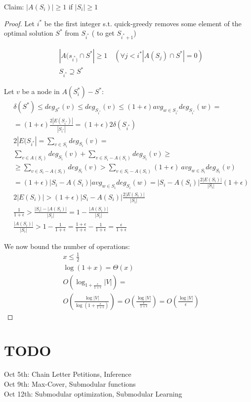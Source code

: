 \documentclass[]{article}
\begin{document}
	Claim: $ |A(S_i)| \geq 1 $ if $ |S_i| \geq 1$
	\begin{proof}

	Let $ i^* $ be the first integer s.t. quick-greedy removes some element of the optimal solution $ S^* $ from $ S_{i^*} $ ( to get $ S_{i^* + 1} $)
	
	\begin{align*}
	&|A(s_{i^*)} \cap S^* | \geq 1 \quad \left(\forall j < i^* |A(S_j) \cap S^*| = 0 \right)\\
	&S_{i^*} \supseteq S^*
 	\end{align*}
 	
 	Let $ v $ be a node in $ A(S_i^*) - S^* $:\\
 	\begin{align*}
 		&\delta(S^*) \leq deg_{S^*}(v) \leq deg_{S_{i^*}}(v) \leq (1+\epsilon) avg_{w \in S_{i^*}} deg_{S_{i^*}}(w)=\\
 		&=(1+\epsilon) \frac{2|E(S_{i^*})|}{|S_{i^*}|} = (1+\epsilon) 2 \delta(S_{i^*})\\
 		& 2|E(S_{i^*}| = \sum_{v \in S_i}^{} deg_{S_i}(v) =\\
 		&\sum_{v \in A(S_i)}^{} deg_{S_i}(v) + \sum_{v \in S_i - A(S_i)}^{} deg_{S_i}(v)\geq\\
 		&\geq \sum_{v \in S_i - A(S_i)}^{} deg_{S_i}(v) > \sum_{v \in S_i - A(S_i)}^{} (1+\epsilon)\ avg_{w \in S_i}deg_{S_i}(v)\\
 		&=(1+\epsilon) |S_i - A(S_i)|  avg_{w \in S_i}deg_{S_i}(w) = |S_i - A(S_i)| \frac{2|E(S_{i})|}{|S_{i}|} (1+\epsilon)\\
 		&2|E(S_i)| > (1+\epsilon) |S_i - A(S_i)| \frac{2|E(S_{i})|}{|S_{i}|}\\
 		& \frac{1}{1+\epsilon} > \frac{|S_i| - |A(S_i)|}{|S_i|} = 1 - \frac{|A(S_i)|}{|S_i|}\\
 		&\frac{|A(S_i)|}{|S_i|} > 1 - \frac{1}{1+\epsilon} = \frac{1+\epsilon}{1+\epsilon} - \frac{1}{1+\epsilon} = \frac{\epsilon}{1+\epsilon} 
 	\end{align*}
 	
 	We now bound the number of operations:
 	\begin{align*}
 		&x\leq \frac{1}{2}\\
 		&\log(1+x) = \Theta(x)\\
 		& O\left(\log_{1+\frac{\epsilon}{1+\epsilon}} |V|\right) = \\
 		& O\left(\frac{\log |V|}{\log \left( 1+\frac{\epsilon}{1+\epsilon} \right)} \right) = O\left(\frac{\log |V|}{\frac{\epsilon}{1+\epsilon}} \right) =  O\left(\frac{\log |V|}{\epsilon} \right)
 	\end{align*}
\end{proof}
\section{TODO}


Oct 5th:  Chain Letter Petitions, Inference\\
Oct 9th: Max-Cover, Submodular functions\\
Oct 12th: Submodular optimization, Submodular Learning\\
\end{document}
